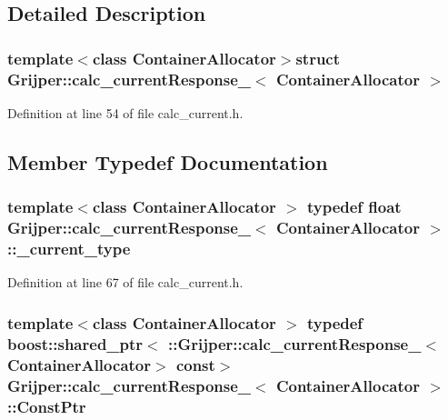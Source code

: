 \subsection{Detailed Description}
\subsubsection*{template$<$class Container\-Allocator$>$struct Grijper\-::calc\-\_\-current\-Response\-\_\-$<$ Container\-Allocator $>$}



Definition at line 54 of file calc\-\_\-current.\-h.



\subsection{Member Typedef Documentation}
\subsubsection[{\-\_\-current\-\_\-type}]{\setlength{\rightskip}{0pt plus 5cm}template$<$class Container\-Allocator $>$ typedef float {\bf Grijper\-::calc\-\_\-current\-Response\-\_\-}$<$ Container\-Allocator $>$\-::{\bf \-\_\-current\-\_\-type}}\label{structGrijper_1_1calc__currentResponse___aee2a76bf61d6dffc26d6e743a78fda27}


Definition at line 67 of file calc\-\_\-current.\-h.

\subsubsection[{Const\-Ptr}]{\setlength{\rightskip}{0pt plus 5cm}template$<$class Container\-Allocator $>$ typedef boost\-::shared\-\_\-ptr$<$ \-::{\bf Grijper\-::calc\-\_\-current\-Response\-\_\-}$<$Container\-Allocator$>$ const$>$ {\bf Grijper\-::calc\-\_\-current\-Response\-\_\-}$<$ Container\-Allocator $>$\-::{\bf Const\-Ptr}}\label{structGrijper_1_1calc__currentResponse___a2979c22ac5f96622a381a1474a94acc6}


